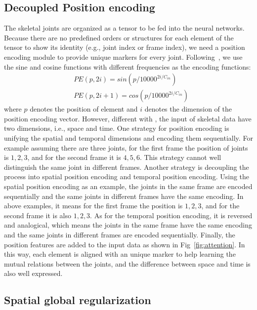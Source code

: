 \documentclass[runningheads]{llncs}
\begin{document}
\subsection{Decoupled Position encoding}
\label{sec:positionencoding}
The skeletal joints are organized as a tensor to be fed into the neural networks. 
Because there are no predefined orders or structures for each element of the tensor to show its identity (e.g., joint index or frame index), we need a position encoding module to provide unique markers for every joint. 
Following~\cite{vaswani_attention_2017}, we use the sine and cosine functions with different frequencies as the encoding functions: 
\begin{equation}
\begin{aligned}
    &PE(p, 2i) = sin(p/10000^{2i/C_{in}}) \\
    &PE(p, 2i+1) = cos(p/10000^{2i/C_{in}})    
\end{aligned}
\end{equation}
where $p$ denotes the position of element and $i$ denotes the dimension of the position encoding vector.
However, different with \cite{vaswani_attention_2017}, the input of skeletal data have two dimensions, i.e., space and time. 
One strategy for position encoding is unifying the spatial and temporal dimensions and encoding them sequentially. 
For example assuming there are three joints, for the first frame the position of joints is $1, 2, 3$, and for the second frame it is $4, 5, 6$. 
This strategy cannot well distinguish  the same joint in different frames. 
Another strategy is decoupling the process into spatial position encoding and temporal position encoding. 
Using the spatial position encoding as an example, the joints in the same frame are encoded sequentially and the same joints in different frames have the same encoding. 
In above examples, it means for the first frame the position is $1, 2, 3$, and for the second frame it is also $1, 2, 3$. 
As for the temporal position encoding, it is reversed and analogical, which means the joints in the same frame have the same encoding and the same joints in different frames are encoded sequentially. 
Finally, the position features are added to the input data as shown in Fig~\ref{fig:attention}. 
In this way, each element is aligned with an unique marker to help learning the mutual relations between the joints, and the difference between space and time is also well expressed. 

\subsection{Spatial global regularization}
\label{sec:regularization}
\end{document}
